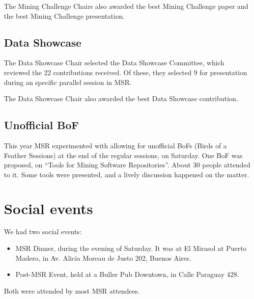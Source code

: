 \documentclass[a4paper]{report}
\begin{document}
The Mining Challenge Chairs also awarded the best Mining Challenge paper and the best Mining Challenge presentation.

\subsection{Data Showcase}

The Data Showcase Chair selected the Data Showcase Committee, which reviewed the 22 contributions received. Of these, they selected 9 for presentation during an specific parallel session in MSR.

The Data Showcase Chair also awarded the best Data Showcase contribution.

\subsection{Unofficial BoF}

This year MSR experimented with allowing for unofficial BoFs (Birds of a Feather Sessions) at the end of the regular sessions, on Saturday. One BoF was proposed, on ``Tools for Mining Software Repositories''. About 30 people attended to it. Some tools were presented, and a lively discussion happened on the matter.

\section{Social events}

We had two social events:

\begin{itemize}
\item MSR Dinner, during the evening of Saturday. It was at El Mirasol at Puerto Madero, in Av. Alicia Moreau de Justo 202, Buenos Aires.

\item Post-MSR Event, held at a Buller Pub Downtown, in Calle Paraguay 428.
\end{itemize}

Both were attended by most MSR attendees.

\end{document}
